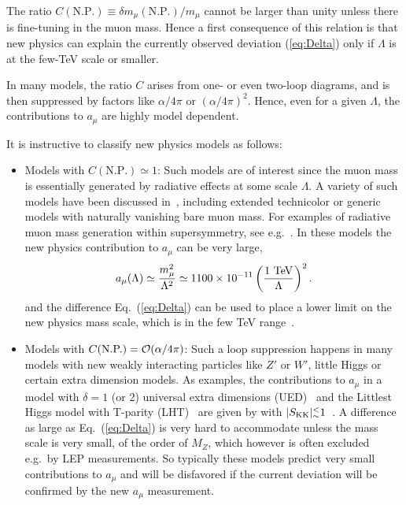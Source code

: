 The ratio $C(\mbox{N.P.})\equiv\delta m_\mu(\mbox{N.P.})/{m_\mu}$
cannot be larger than unity unless there is fine-tuning in the muon
mass. Hence a first consequence of this relation is that new physics
can explain the currently observed deviation (\ref{eq:Delta}) only if
$\Lambda$ is at the few-TeV scale or smaller.

In many models, the ratio $C$ arises from one- or even two-loop
diagrams, and is then suppressed by factors like  $\alpha/4\pi$ or
$(\alpha/4\pi)^2$. Hence, even for a given $\Lambda$, the
contributions to $a_\mu$ are highly model dependent.

It is instructive to classify new physics models as follows:
\begin{itemize}
\item Models with $C(\mbox{N.P.})\simeq1$: Such models are of interest
  since the muon
  mass is essentially generated by radiative effects  at some
scale $\Lambda$.
A variety of such models  have been discussed in~\cite{czmar}, including
extended technicolor or generic models with naturally vanishing bare
muon mass. For examples of radiative muon mass generation within
supersymmetry, see e.g.\ 
\cite{Borzumati:1999sp,Crivellin:2010ty}.  In these models the
new physics contribution to $a_\mu$ can be very large, 
\begin{equation} 
a_{\mu}
(\Lambda) \simeq {m^2_{\mu} \over \Lambda^2}\simeq
1100\times10^{-11}\left(\frac{1\mbox{ TeV}}{\Lambda}\right)^2. 
\end{equation}
and the difference Eq.~(\ref{eq:Delta}) can  be used to place a lower
limit on the new physics mass scale, which is in the few TeV
range~\cite{elp,Crivellin:2010ty}.
\item Models with $C(\mbox{N.P.})={\cal O}(\alpha/4\pi)$:
Such a loop suppression happens in many models with new weakly
interacting particles like $Z'$ or $W'$, little Higgs or certain extra
dimension models.  As examples, the contributions to $a_\mu$ in a
model with $\delta=1$ (or
2) universal extra dimensions (UED)~\cite{AppelqDob} and the Littlest Higgs
model with T-parity (LHT)~\cite{Blanke:2007db} are given by
 with $|S_{\rm KK}| _{\sim}^{<}1$~\cite{AppelqDob}.
A difference as large as
Eq.~(\ref{eq:Delta}) is very hard to accommodate unless the mass scale
is very small, of the order of $M_Z$, which however is often excluded
e.g.\ by LEP measurements.
So typically these models predict very small contributions to $a_\mu$
and will be disfavored if the current deviation will be confirmed by
the new $a_\mu$ measurement.


\end{itemize}
